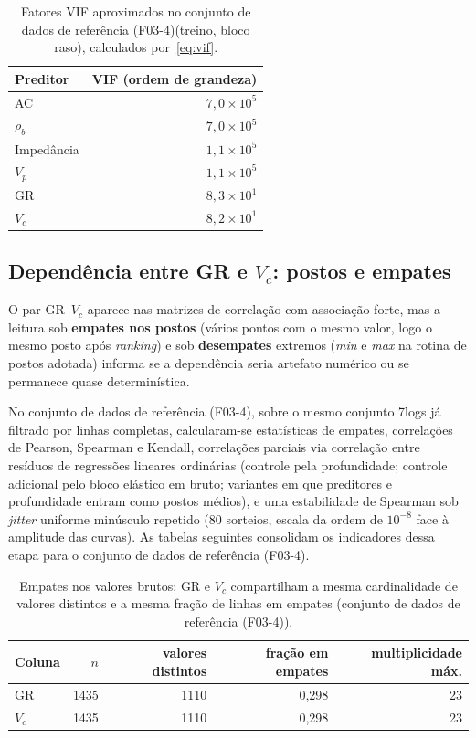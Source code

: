 \documentclass[12pt,a4paper]{article}
\newcommand{\dadosref}{conjunto de dados de referência (F03-4)}
\begin{document}
\begin{table}[h]
\centering
\begin{tabular}{lr}
\toprule
Preditor & VIF (ordem de grandeza) \\
\midrule
AC & $7{,}0 \times 10^5$ \\
$\rho_b$ & $7{,}0 \times 10^5$ \\
Impedância & $1{,}1 \times 10^5$ \\
$V_p$ & $1{,}1 \times 10^5$ \\
GR & $8{,}3 \times 10^1$ \\
$V_c$ & $8{,}2 \times 10^1$ \\
\bottomrule
\end{tabular}
\caption{Fatores VIF aproximados no \dadosref (treino, bloco raso), calculados por~\eqref{eq:vif}.}
\label{tab:vif}
\end{table}

\subsection{Dependência entre GR e \(V_c\): postos e empates}\label{subsec:grvc}
O par GR--\(V_c\) aparece nas matrizes de correlação com associação forte,
mas a leitura sob \textbf{empates nos postos} (vários pontos com o mesmo valor,
logo o mesmo posto após \textit{ranking}) e sob \textbf{desempates} extremos
(\textit{min} e \textit{max} na rotina de postos adotada) informa se a dependência seria
artefato numérico ou se permanece quase determinística.

No \dadosref, sobre o mesmo conjunto 7logs já filtrado por linhas
completas, calcularam-se estatísticas de empates, correlações de Pearson,
Spearman e Kendall, correlações parciais via correlação entre resíduos
de regressões lineares ordinárias (controle pela profundidade; controle adicional
pelo bloco elástico em bruto; variantes em que preditores e profundidade entram
como postos médios), e uma estabilidade de Spearman sob \textit{jitter} uniforme
minúsculo repetido (80 sorteios, escala da ordem de \(10^{-8}\) face à amplitude
das curvas). As tabelas seguintes consolidam os indicadores dessa etapa para o \dadosref.

\begin{table}[h]
\centering
\begin{tabular}{lrrrr}
\toprule
Coluna & \(n\) & valores distintos & fração em empates & multiplicidade máx. \\
\midrule
GR & 1435 & 1110 & 0{,}298 & 23 \\
\(V_c\) & 1435 & 1110 & 0{,}298 & 23 \\
\bottomrule
\end{tabular}
\caption{Empates nos valores brutos: GR e \(V_c\) compartilham a mesma cardinalidade
de valores distintos e a mesma fração de linhas em empates (\dadosref).}
\label{tab:grvc_ties}
\end{table}
\end{document}
